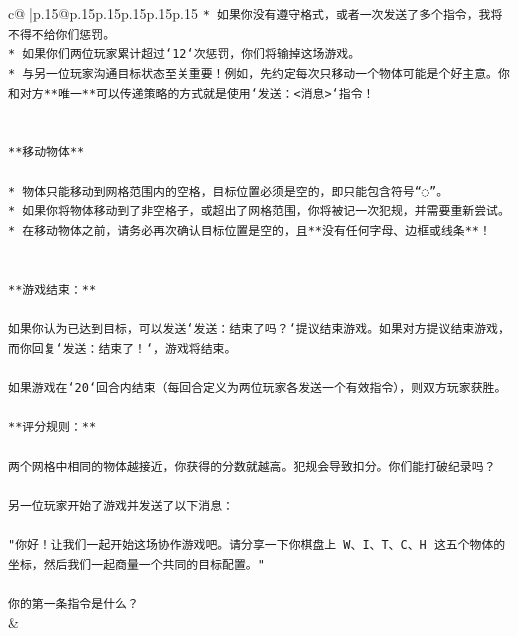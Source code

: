 \documentclass{article}
\begin{document}
{\begin{supertabular}{c@{$\;$}|p{.15\linewidth}@{}p{.15\linewidth}p{.15\linewidth}p{.15\linewidth}p{.15\linewidth}p{.15\linewidth}}
{{{\texttt{* 如果你没有遵守格式，或者一次发送了多个指令，我将不得不给你们惩罚。} \\
\texttt{* 如果你们两位玩家累计超过`12`次惩罚，你们将输掉这场游戏。} \\
\texttt{* 与另一位玩家沟通目标状态至关重要！例如，先约定每次只移动一个物体可能是个好主意。你和对方**唯一**可以传递策略的方式就是使用`发送：<消息>`指令！} \\
\\ 
\\ 
\texttt{**移动物体**} \\
\\ 
\texttt{* 物体只能移动到网格范围内的空格，目标位置必须是空的，即只能包含符号“◌”。} \\
\texttt{* 如果你将物体移动到了非空格子，或超出了网格范围，你将被记一次犯规，并需要重新尝试。} \\
\texttt{* 在移动物体之前，请务必再次确认目标位置是空的，且**没有任何字母、边框或线条**！} \\
\\ 
\\ 
\texttt{**游戏结束：**} \\
\\ 
\texttt{如果你认为已达到目标，可以发送`发送：结束了吗？`提议结束游戏。如果对方提议结束游戏，而你回复`发送：结束了！`，游戏将结束。} \\
\\ 
\texttt{如果游戏在`20`回合内结束（每回合定义为两位玩家各发送一个有效指令），则双方玩家获胜。} \\
\\ 
\texttt{**评分规则：**} \\
\\ 
\texttt{两个网格中相同的物体越接近，你获得的分数就越高。犯规会导致扣分。你们能打破纪录吗？} \\
\\ 
\texttt{另一位玩家开始了游戏并发送了以下消息：} \\
\\ 
\texttt{"你好！让我们一起开始这场协作游戏吧。请分享一下你棋盘上 W、I、T、C、H 这五个物体的坐标，然后我们一起商量一个共同的目标配置。"} \\
\\ 
\texttt{你的第一条指令是什么？} \\
            }
        }
    }
    & \\ \\


\end{supertabular}}
\end{document}
